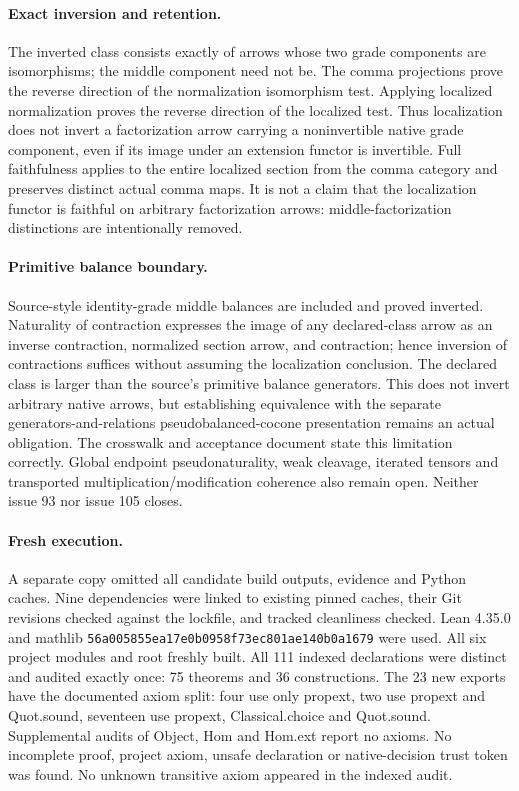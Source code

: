 \documentclass{article}
\begin{document}
\paragraph{Exact inversion and retention.} The inverted class consists exactly of arrows whose two grade components are isomorphisms; the middle component need not be. The comma projections prove the reverse direction of the normalization isomorphism test. Applying localized normalization proves the reverse direction of the localized test. Thus localization does not invert a factorization arrow carrying a noninvertible native grade component, even if its image under an extension functor is invertible. Full faithfulness applies to the entire localized section from the comma category and preserves distinct actual comma maps. It is not a claim that the localization functor is faithful on arbitrary factorization arrows: middle-factorization distinctions are intentionally removed.
\paragraph{Primitive balance boundary.} Source-style identity-grade middle balances are included and proved inverted. Naturality of contraction expresses the image of any declared-class arrow as an inverse contraction, normalized section arrow, and contraction; hence inversion of contractions suffices without assuming the localization conclusion. The declared class is larger than the source's primitive balance generators. This does not invert arbitrary native arrows, but establishing equivalence with the separate generators-and-relations pseudobalanced-cocone presentation remains an actual obligation. The crosswalk and acceptance document state this limitation correctly. Global endpoint pseudonaturality, weak cleavage, iterated tensors and transported multiplication/modification coherence also remain open. Neither issue 93 nor issue 105 closes.
\paragraph{Fresh execution.} A separate copy omitted all candidate build outputs, evidence and Python caches. Nine dependencies were linked to existing pinned caches, their Git revisions checked against the lockfile, and tracked cleanliness checked. Lean 4.35.0 and mathlib \texttt{56a005855ea17e0b0958f73ec801ae140b0a1679} were used. All six project modules and root freshly built. All 111 indexed declarations were distinct and audited exactly once: 75 theorems and 36 constructions. The 23 new exports have the documented axiom split: four use only propext, two use propext and Quot.sound, seventeen use propext, Classical.choice and Quot.sound. Supplemental audits of Object, Hom and Hom.ext report no axioms. No incomplete proof, project axiom, unsafe declaration or native-decision trust token was found. No unknown transitive axiom appeared in the indexed audit.
\end{document}
